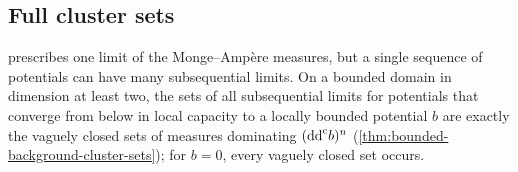 \subsection{Full cluster sets}
\label{subsec:zero-local-cluster-sets}\label{subsec:bounded-background-cluster-sets}

 prescribes one limit of the Monge--Amp\`ere measures, but a single sequence of potentials can have many subsequential limits. On a bounded domain in dimension at least two, the sets of all subsequential limits for potentials that converge from below in local capacity to a locally bounded potential $b$ are exactly the vaguely closed sets of measures dominating $(\mathrm{dd}^{\mathrm{c}} b)^n$ (\cref{thm:bounded-background-cluster-sets}); for $b=0$, every vaguely closed set occurs.
